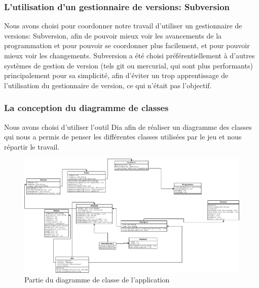 \subsubsection{L'utilisation d'un gestionnaire de versions: Subversion}

Nous avons choisi pour coordonner notre travail d'utiliser un gestionnaire de versions: Subversion, afin de pouvoir mieux voir les avancements de la programmation et pour pouvoir se coordonner plus facilement, et pour pouvoir mieux voir les changements. Subversion a été choisi préférentiellement à d'autres systèmes de gestion de version (tels git ou mercurial, qui sont plus performants) principalement pour sa simplicité, afin d'éviter un trop apprentissage de l'utilisation du gestionnaire de version, ce qui n'était pas l'objectif.

\subsubsection{La conception du diagramme de classes}
Nous avons choisi d'utiliser l'outil Dia afin de réaliser un diagramme des classes qui nous a permis de penser les différentes classes utilisées par le jeu et nous répartir le travail.

\begin{figure}[h]
\centering
\includegraphics[scale=0.25]{figures/UML.png}
\caption{Partie du diagramme de classe de l'application}
\label{Partie du diagramme de classe de l'application}
\end{figure}